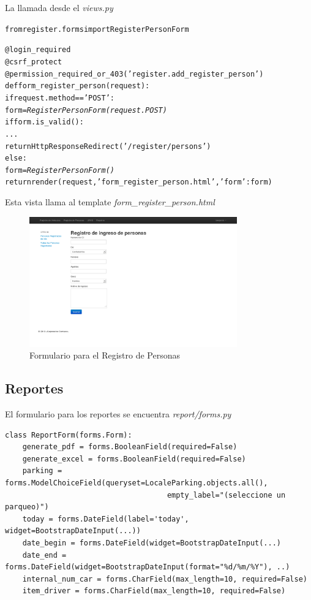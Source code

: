 La llamada desde el {\it views.py}

\begin{alltt}

from register.forms import RegisterPersonForm

@login_required
@csrf_protect
@permission_required_or_403('register.add_register_person')
def form_register_person(request):
    if request.method == 'POST':
        form = \emph{RegisterPersonForm(request.POST)}
        if form.is_valid():
            ...
            return HttpResponseRedirect('/register/persons')
    else:
        form  = \emph{RegisterPersonForm()}
    return render(request, 'form_register_person.html', {'form': form})
\end{alltt}

Esta vista llama al template {\it form\_register\_person.html}

\begin{figure}[h]
  \begin{center}
    \includegraphics[width=0.8\textwidth]{figures/chapter5/registro_personas.png}
    \caption[Formulario de Registro de Personas]{Formulario para el Registro de Personas}
  \end{center}
\end{figure}

\newpage

\subsection{Reportes}
El formulario para los reportes se encuentra {\it report/forms.py}

\begin{verbatim}
class ReportForm(forms.Form):
    generate_pdf = forms.BooleanField(required=False)
    generate_excel = forms.BooleanField(required=False)
    parking = forms.ModelChoiceField(queryset=LocaleParking.objects.all(),
                                     empty_label="(seleccione un parqueo)")
    today = forms.DateField(label='today', widget=BootstrapDateInput(...))
    date_begin = forms.DateField(widget=BootstrapDateInput(...)
    date_end = forms.DateField(widget=BootstrapDateInput(format="%d/%m/%Y"), ..)
    internal_num_car = forms.CharField(max_length=10, required=False)
    item_driver = forms.CharField(max_length=10, required=False)
\end{verbatim}

